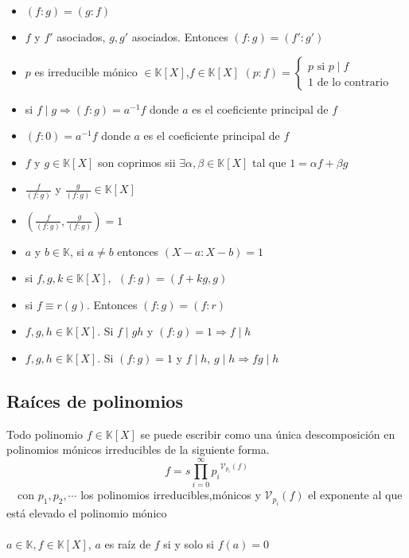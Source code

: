 \documentclass[a4paper,10pt]{article}
\begin{document}
\propiedades
\begin{itemize}
	\item $(f:g)=(g:f)$
	\item $f$ y $f'$ asociados, $g,g'$ asociados. Entonces $(f:g)=(f':g')$
	\item $p$ es irreducible mónico $\in \mathbb{K}[X]$,$f \in \mathbb{K}[X]$ $(p:f) = 
	\left\{
		\begin{array}{l}
    			p \mbox{ si } p \mid f
  		\\  1 \mbox{ de lo contrario }
	\end{array}
	\right.$
	\item si $f \mid g \Rightarrow (f:g)=a^{-1}f$ donde $a$ es el coeficiente principal de $f$
	\item $(f:0)=a^{-1}f$ donde $a$ es el coeficiente principal de $f$ 
	\item $f$ y $g \in \mathbb{K}[X]$ son coprimos sii $\exists \alpha,\beta \in \mathbb{K}[X]$ tal que $1 = \alpha f + \beta g$
	\item $\frac{f}{(f:g)}$ y $\frac{g}{(f:g)} \in \mathbb{K}[X]$
	\item $\left( \frac{f}{(f:g)},\frac{g}{(f:g)} \right)=1$
	\item $a$ y $b \in \mathbb{K}$, si $a \neq b$ entonces $(X-a:X-b)=1$
	\item si $f,g,k \in \mathbb{K}[X], \ \ (f:g)=(f+kg,g)$
	\item si $f \equiv r (g)$. Entonces $(f:g)=(f:r)$
	\item $f,g,h \in \mathbb{K}[X]$. Si $f \mid gh$ y $(f:g)=1 \Rightarrow f \mid h$
	\item $f,g,h \in \mathbb{K}[X]$. Si $(f:g)=1$ y $f \mid h$, $g \mid h \Rightarrow fg \mid h$
\end{itemize}


\subsection{Raíces de polinomios}


\teorema Todo polinomio $f \in \mathbb{K}[X]$ se puede escribir como una única descomposición en polinomios mónicos irreducibles de la siguiente forma.
$$f = s \prod_{i=0}^{\infty} {{p_{i}}^{\mathcal{V}_{p_i}(f)}}$$ \ \ con $p_1,p_2,\cdots$ los polinomios irreducibles,mónicos y $\mathcal{V}_{p_i} (f)$ el exponente al que está elevado el polinomio mónico \\ \\

 $a \in \mathbb{K},f \in \mathbb{K}[X]$, $a$ es raíz de $f$ si y solo si $f(a) = 0$ \\ \\
\end{document}
